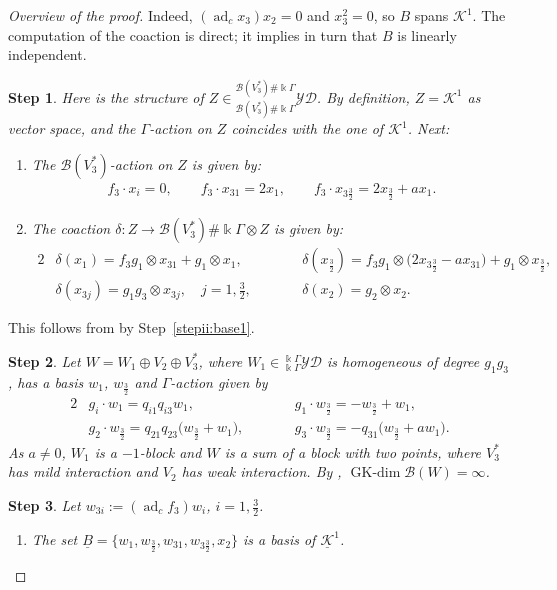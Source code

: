 \documentclass[10pt,a4paper]{amsart}
\numberwithin{equation}{section}
\newtheorem{stepii}{Step}
\newcommand{\adc}{\operatorname{ad}_c}
\newcommand{\GK}{\operatorname{GK-dim}}
\newcommand{\toba}{\mathscr B}
\newcommand{\K}{{\mathcal{K}}}
\newcommand{\Ku}{\underline{\mathcal K}}
\newcommand{\yd}[1]{{}_{#1}^{#1}\mathcal{YD}}
\newcommand{\tresdos}{\frac{3}{2}}
\begin{document}
\begin{proof}[Overview of the proof]
Indeed, $(\adc x_3)x_2=0$ and $x_3^2=0$, so $B$ spans $\K^1$.
The computation of the coaction is direct; it implies in turn that $B$ is linearly independent.

\begin{stepii}
Here is the structure of $Z\in \yd{\toba(V_3^*)\#\Bbbk \Gamma}$.
By definition, $Z=\K^1$ as vector space, and the $\Gamma$-action on $Z$ coincides with the one of $\K^1$.
Next:
\begin{enumerate}[label=$(\roman*)$]
\item The $\toba(V_3^*)$-action on $Z$ is given by:
\begin{align*}
f_3 \cdot x_i =0,\qquad f_3 \cdot x_{31} = 2x_1,\qquad f_3 \cdot x_{3\tresdos} = 2x_{\tresdos}+ax_1.
\end{align*}
\item The coaction $\delta\colon Z\to \toba(V_3^*)\#\Bbbk\Gamma\otimes Z$ is given by:
\begin{alignat*}{2}
&\delta(x_1) = f_3g_1 \otimes x_{31}+g_1\otimes x_1,&&
\delta(x_{\tresdos}) = f_3g_1 \otimes \big(2x_{3\tresdos}-ax_{31}\big)+g_1\otimes x_{\tresdos},
\\
&\delta(x_{3j})=g_1g_3\otimes x_{3j}, \quad j=1,\tfrac{3}{2},\qquad
&&\delta(x_2) = g_2\otimes x_2.
\end{alignat*}
\end{enumerate}
\end{stepii}
This follows from \cite[Theorem 12.3.2 and Remark 12.3.8]{HS-book} by Step~\ref{stepii:base1}.

\begin{stepii} \label{stepii:def-W}
Let $W=W_1\oplus V_2\oplus V_3^*$,
where $W_1\in\yd{\Bbbk\Gamma}$ is homogeneous of degree $g_1g_3$, has a basis $w_1$, $w_{\tresdos}$ and $\Gamma$-action given by
\begin{alignat*}{2}
&g_i\cdot w_1=q_{i1}q_{i3}w_1, &&
g_1 \cdot w_{\tresdos}=-w_{\tresdos}+w_1,
\\
&g_2 \cdot w_{\tresdos}=q_{21}q_{23}\big(w_{\tresdos}+w_1\big), \qquad&&
g_3 \cdot w_{\tresdos}=-q_{31}\big(w_{\tresdos}+aw_1\big).
\end{alignat*}
As $a\ne 0$, $W_1$ is a $-1$-block and $W$ is a sum of a block with two points, where $V_3^*$ has mild interaction and $V_2$ has weak interaction.
By {\rm \cite[Lemma~5.4.11]{AAH-triang}}, $\GK\toba(W)=\infty$.
\end{stepii}

\begin{stepii}\label{stepii:base2} Let $w_{3i}:=(\adc f_3)w_i$, $i=1,\tresdos$.
\begin{enumerate}[label=$(\roman*)$]
\item The set $\underline{B}=\big\{w_1,w_{\tresdos},w_{31},w_{3\tresdos},x_2\big\}$ is a basis of $\Ku^1$.


\end{enumerate}
\end{stepii}
\end{proof}
\end{document}
